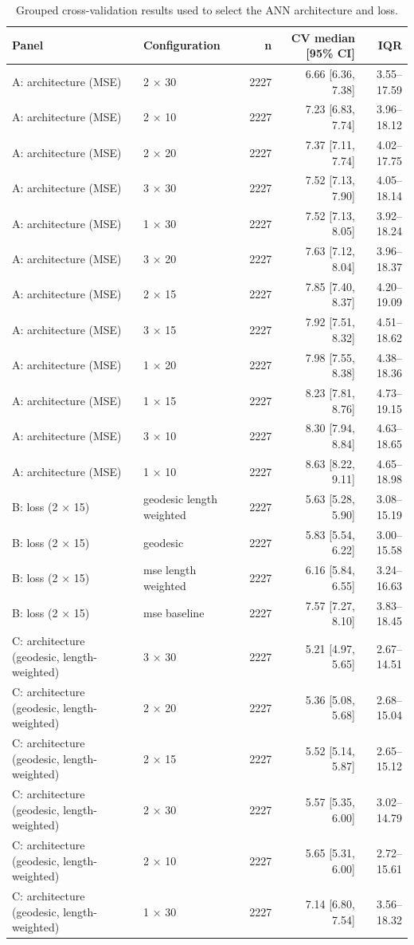 \begin{table}[h!]
    \centering
    \caption{Grouped cross-validation results used to select the ANN architecture and loss.}
    \label{tab:selection}
    \begin{tabular}{@{}llrrr@{}}
        \toprule
        Panel & Configuration & n & CV median [95\% CI] & IQR \\
        \midrule
        A: architecture (MSE) & 2 × 30 & 2227 & 6.66 [6.36, 7.38] & 3.55–17.59 \\
        A: architecture (MSE) & 2 × 10 & 2227 & 7.23 [6.83, 7.74] & 3.96–18.12 \\
        A: architecture (MSE) & 2 × 20 & 2227 & 7.37 [7.11, 7.74] & 4.02–17.75 \\
        A: architecture (MSE) & 3 × 30 & 2227 & 7.52 [7.13, 7.90] & 4.05–18.14 \\
        A: architecture (MSE) & 1 × 30 & 2227 & 7.52 [7.13, 8.05] & 3.92–18.24 \\
        A: architecture (MSE) & 3 × 20 & 2227 & 7.63 [7.12, 8.04] & 3.96–18.37 \\
        A: architecture (MSE) & 2 × 15 & 2227 & 7.85 [7.40, 8.37] & 4.20–19.09 \\
        A: architecture (MSE) & 3 × 15 & 2227 & 7.92 [7.51, 8.32] & 4.51–18.62 \\
        A: architecture (MSE) & 1 × 20 & 2227 & 7.98 [7.55, 8.38] & 4.38–18.36 \\
        A: architecture (MSE) & 1 × 15 & 2227 & 8.23 [7.81, 8.76] & 4.73–19.15 \\
        A: architecture (MSE) & 3 × 10 & 2227 & 8.30 [7.94, 8.84] & 4.63–18.65 \\
        A: architecture (MSE) & 1 × 10 & 2227 & 8.63 [8.22, 9.11] & 4.65–18.98 \\
        B: loss (2 × 15) & geodesic length weighted & 2227 & 5.63 [5.28, 5.90] & 3.08–15.19 \\
        B: loss (2 × 15) & geodesic & 2227 & 5.83 [5.54, 6.22] & 3.00–15.58 \\
        B: loss (2 × 15) & mse length weighted & 2227 & 6.16 [5.84, 6.55] & 3.24–16.63 \\
        B: loss (2 × 15) & mse baseline & 2227 & 7.57 [7.27, 8.10] & 3.83–18.45 \\
        C: architecture (geodesic, length-weighted) & 3 × 30 & 2227 & 5.21 [4.97, 5.65] & 2.67–14.51 \\
        C: architecture (geodesic, length-weighted) & 2 × 20 & 2227 & 5.36 [5.08, 5.68] & 2.68–15.04 \\
        C: architecture (geodesic, length-weighted) & 2 × 15 & 2227 & 5.52 [5.14, 5.87] & 2.65–15.12 \\
        C: architecture (geodesic, length-weighted) & 2 × 30 & 2227 & 5.57 [5.35, 6.00] & 3.02–14.79 \\
        C: architecture (geodesic, length-weighted) & 2 × 10 & 2227 & 5.65 [5.31, 6.00] & 2.72–15.61 \\
        C: architecture (geodesic, length-weighted) & 1 × 30 & 2227 & 7.14 [6.80, 7.54] & 3.56–18.32 \\
        \bottomrule
    \end{tabular}
\end{table}
